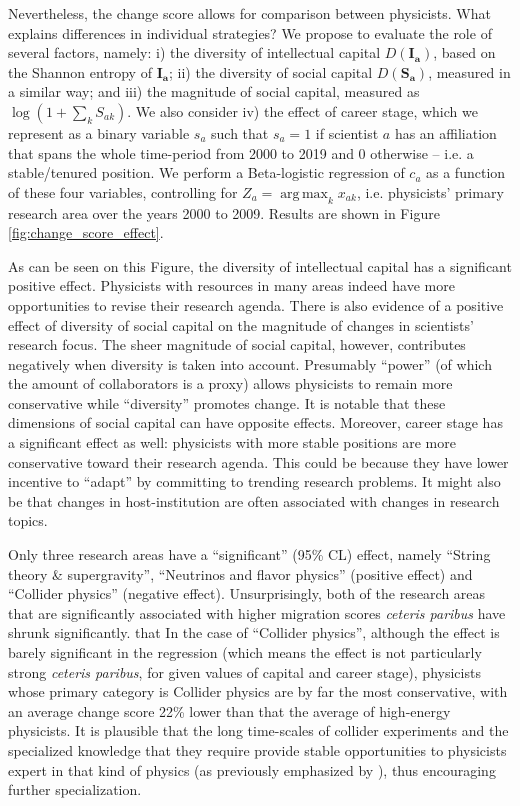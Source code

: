 \documentclass{article}
\DeclareMathOperator*{\argmax}{arg\,max}
\begin{document}
Nevertheless, the change score allows for comparison between physicists. What explains differences in individual strategies? We propose to evaluate the role of several factors, namely: i) the diversity of intellectual capital $D(\bm{I_a})$, based on the Shannon entropy of $\bm{I_a}$; ii) the diversity of social capital $D(\bm{S_a})$, measured in a similar way; and iii) the magnitude of social capital, measured as $\log(1+\sum_k S_{ak})$. We also consider iv) the effect of career stage, which we represent as a binary variable $s_a$ such that $s_a=1$ if scientist $a$ has an affiliation that spans the whole time-period from 2000 to 2019 and 0 otherwise -- i.e. a stable/tenured position. We perform a Beta-logistic regression of $c_a$ as a function of these four variables, controlling for $Z_a=\argmax_{k} x_{ak}$, i.e. physicists' primary research area over the years 2000 to 2009. Results are shown in Figure \ref{fig:change_score_effect}.

As can be seen on this Figure, the diversity of intellectual capital has a significant positive effect. Physicists with resources in many areas indeed have more opportunities to revise their research agenda. There is also evidence of a positive effect of diversity of social capital on the magnitude of changes in scientists' research focus. The sheer magnitude of social capital, however, contributes negatively when diversity is taken into account. Presumably ``power'' (of which the amount of collaborators is a proxy) allows physicists to remain more conservative while ``diversity'' promotes change. It is notable that these dimensions of social capital can have opposite effects. Moreover, career stage has a significant effect as well: physicists with more stable positions are more conservative toward their research agenda. This could be because they have lower incentive to ``adapt'' by committing to trending research problems. It might also be that changes in host-institution are often associated with changes in research topics.

Only three research areas have a ``significant'' (95\% CL) effect, namely ``String theory \& supergravity'', ``Neutrinos and flavor physics'' (positive effect) and ``Collider physics'' (negative effect). Unsurprisingly, both of the research areas that are significantly associated with higher migration scores \textit{ceteris paribus} have shrunk significantly. that  In the case of ``Collider physics'', although the effect is barely significant in the regression (which means the effect is not particularly strong \textit{ceteris paribus}, for given values of capital and career stage), physicists whose primary category is Collider physics are by far the most conservative, with an average change score 22\% lower than that the average of high-energy physicists. It is plausible that the long time-scales of collider experiments and the specialized knowledge that they require provide stable opportunities to physicists expert in that kind of physics (as previously emphasized by \citealt[p.~138]{galison1987how}), thus encouraging further specialization.
\end{document}
